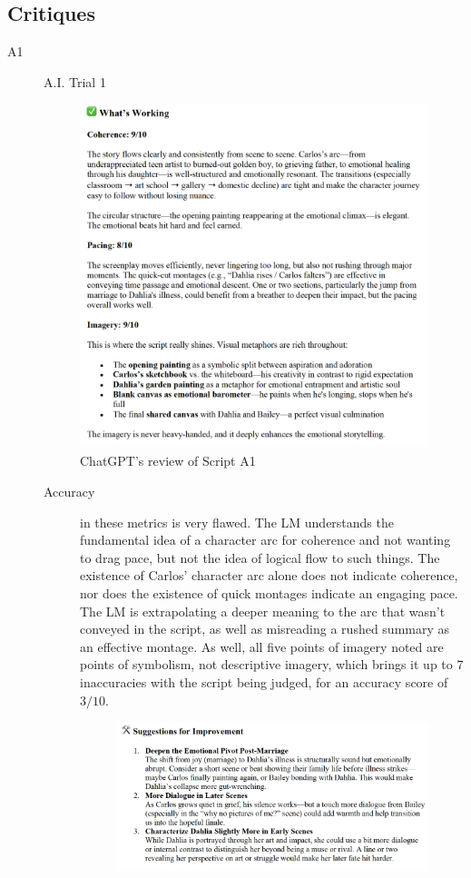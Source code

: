 \documentclass[sigconf]{acmart}
\begin{document}
\subsection{Critiques}
\begin{description}
    \item[A1] A.I. Trial 1
    \begin{figure}[!hbt]
            \centering
            \includegraphics[width=0.5\linewidth]{images/A1Metrics.png}
            \caption{ChatGPT's review of Script A1}
            \label{fig:a1-metrics}
    \end{figure}
    \begin{description}
        \item[Accuracy] in these metrics is very flawed. The LM understands the fundamental idea of a character arc for coherence and not wanting to drag pace, but not the idea of logical flow to such things. The existence of Carlos' character arc alone does not indicate coherence, nor does the existence of quick montages indicate an engaging pace. The LM is extrapolating a deeper meaning to the arc that wasn't conveyed in the script, as well as misreading a rushed summary as an effective montage. As well, all five points of imagery noted are points of symbolism, not descriptive imagery, which brings it up to 7 inaccuracies with the script being judged, for an accuracy score of $3/10$.
        \begin{figure}[!hbt]
            \centering
            \includegraphics[width=0.8\linewidth]{images/A1Improvements.png}

\end{figure}
\end{description}
\end{description}
\end{document}
